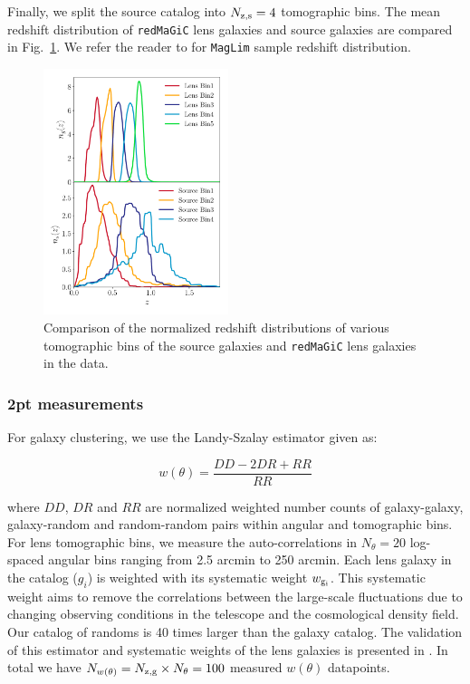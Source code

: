 \documentclass[aps, prd,twocolumn,superscriptaddress,nofootinbib,preprintnumbers]{revtex4-1}
\newcommand{\gammat}{\ensuremath{\gamma_{\rm t}(\theta)}}
\newcommand{\wtheta}{\ensuremath{w(\theta)}}
\newcommand{\redmagic}{\texttt{redMaGiC} }
\newcommand{\maglim}{\texttt{MagLim} }
\newcommand{\blue}[1]{\textcolor{blue}{#1}}
\begin{document}
Finally, we split the source catalog into $N_{\rm z,s} = 4$ tomographic bins. The mean redshift distribution of \redmagic lens galaxies and source galaxies are compared in Fig.~\ref{fig:nz_comp}. We refer the reader to \citet*{y3-2x2ptaltlensresults} for \maglim sample redshift distribution. 
\begin{figure}
\includegraphics[width=0.48\textwidth]{figs/nz_DES.pdf}
\caption[]{Comparison of the normalized redshift distributions of various tomographic bins of the source galaxies and \redmagic lens galaxies in the data.}
\label{fig:nz_comp}
\end{figure}

\subsubsection{2pt measurements}\label{sec:2pt_data}

For galaxy clustering, we use the Landy-Szalay estimator given as:
\begin{linenomath*}
\begin{equation}
    w(\theta) = \frac{DD - 2DR + RR}{RR}
\end{equation}
\end{linenomath*}
where $DD$, $DR$ and $RR$ are normalized weighted number counts of galaxy-galaxy, galaxy-random and random-random pairs within angular and tomographic bins. For lens tomographic bins, we measure the auto-correlations in $N_{\theta} = 20$ log-spaced angular bins ranging from 2.5 arcmin to 250 arcmin. Each lens galaxy in the catalog ($g_i$) is weighted with its systematic weight $w_{\rm g_i}$. This systematic weight aims to remove the correlations between the large-scale fluctuations due to changing observing conditions in the telescope and the cosmological density field. Our catalog of randoms is 40 times larger than the galaxy catalog. The validation of this estimator and systematic weights of the lens galaxies is presented in \cite{y3-galaxyclustering}. In total we have $N_{\wtheta} = N_{\rm z,g} \times N_{\theta} = 100$ measured $\wtheta$ datapoints. 
\end{document}

